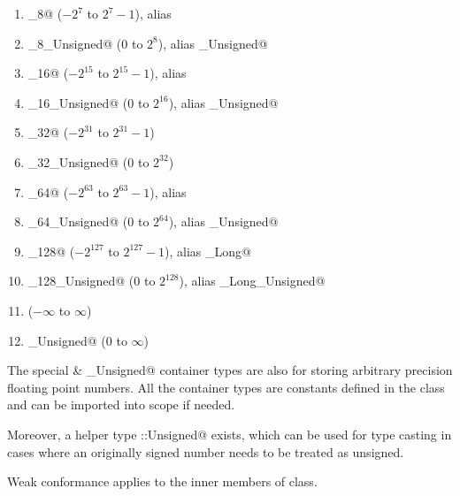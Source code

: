 \begin{enumerate}

\item \lstinline@Integer_8@ ($-2^{7}$ to $2^{7}-1$), alias \lstinline@Byte@

\item \lstinline@Integer_8_Unsigned@ ($0$ to $2^{8}$), alias \lstinline@Byte_Unsigned@

\item \lstinline@Integer_16@ ($-2^{15}$ to $2^{15}-1$), alias \lstinline@Short@

\item \lstinline@Integer_16_Unsigned@ ($0$ to $2^{16}$), alias \lstinline@Short_Unsigned@

\item \lstinline@Integer_32@ ($-2^{31}$ to $2^{31}-1$)

\item \lstinline@Integer_32_Unsigned@ ($0$ to $2^{32}$)

\item \lstinline@Integer_64@ ($-2^{63}$ to $2^{63}-1$), alias \lstinline@Long@

\item \lstinline@Integer_64_Unsigned@ ($0$ to $2^{64}$), alias \lstinline@Long_Unsigned@

\item \lstinline@Integer_128@ ($-2^{127}$ to $2^{127}-1$), alias \lstinline@Double_Long@

\item \lstinline@Integer_128_Unsigned@ ($0$ to $2^{128}$), alias \lstinline@Double_Long_Unsigned@

\item \lstinline@Decimal@ ($-\infty$ to $\infty$)

\item \lstinline@Decimal_Unsigned@ ($0$ to $\infty$)

\end{enumerate}

The special \lstinline@Decimal@ \& \lstinline@Decimal_Unsigned@ container types are also for storing arbitrary precision floating point numbers. All the container types are constants defined in the \lstinline@Number@ class and can be imported into scope if needed. 

Moreover, a helper type \lstinline@Number::Unsigned@ exists, which can be used for type casting in cases where an originally signed number needs to be treated as unsigned. 

Weak conformance applies to the inner members of \lstinline@Number@ class. 

